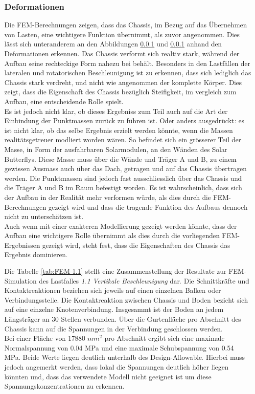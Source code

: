 \subsubsection{Deformationen}
Die FEM-Berechnungen zeigen, dass das Chassis, im Bezug auf das Übernehmen von Lasten, eine wichtigere Funktion übernimmt, als zuvor angenommen. Dies lässt sich unteranderem an den Abbildungen \ref{} und \ref{} anhand den Deformationen erkennen. Das Chassis verformt sich realtiv stark, während der Aufbau seine rechteckige Form nahezu bei behält. Besonders in den Lastfällen der lateralen und rotatorischen Beschleunigung ist zu erkennen, dass sich lediglich das Chassis stark verdreht, und nicht wie angenommen der komplette Körper. Dies zeigt, dass die Eigenschaft des Chassis bezüglich Steifigkeit, im vergleich zum Aufbau, eine entscheidende Rolle spielt. \\


Es ist jedoch nicht klar, ob dieses Ergebniss zum Teil auch auf die Art der Einbindung der Punktmassen zurück zu führen ist. Oder anders ausgedrückt: es ist nicht klar, ob das selbe Ergebnis erzielt werden könnte, wenn die Massen realitätsgetreuer modliert worden wären. So befindet sich ein grösserer Teil der Masse, in Form der ausfahrbaren Solarmodulen, an den Wänden des Solar Butterflys. Diese Masse muss über die Wände und Träger A und B, zu einem gewissen Ausmass auch über das Dach, getragen und auf das Chassis übertragen werden. Die Punktmassen sind jedoch fast ausschliesslich über das Chassis und die Träger A und B im Raum befestigt worden. Es ist wahrscheinlich, dass sich der Aufbau in der Realität mehr verformen würde, als dies durch die FEM-Berechnungen gezeigt wird und dass die tragende Funktion des Aufbaus dennoch nicht zu unterschätzen ist. \\
Auch wenn mit einer exakteren Modellierung gezeigt werden könnte, dass der Aufbau eine wichtigere Rolle übernimmt als dies durch die vorliegenden FEM-Ergebnissen gezeigt wird, steht fest, dass die Eigenschaften des Chassis das Ergebnis dominieren.



Die Tabelle \ref{tab:FEM 1.1} stellt eine Zusammenstellung der Resultate zur FEM-Simulation des Lastfalles \emph{1.1 Vertikale Beschleunigung} dar. Die Schnittkräfte und Kontaktreaktionen beziehen sich jeweils auf einen einzelnen Balken oder Verbindungsstelle. Die Kontaktreaktion zwischen Chassis und Boden bezieht sich auf eine einzelne Knotenverbindung. Insgesammt ist der Boden an jedem Längsträger an 30 Stellen verbunden. Über die Gurtenfläche pro Abschnitt des Chassis kann auf die Spannungen in der Verbindung geschlossen werden.\\
Bei einer Fläche von 17880 $mm^2$ pro Abschnitt ergibt sich eine maximale Normalspannung von 0.04 MPa und eine maximale Schubspannung von 0.54 MPa. Beide Werte liegen deutlich unterhalb des Design-Allowable. Hierbei muss jedoch angemerkt werden, dass lokal die Spannungen deutlich höher liegen könnten und, dass das verwendete Modell nicht geeignet ist um diese Spannungskonzentrationen zu erkennen.

